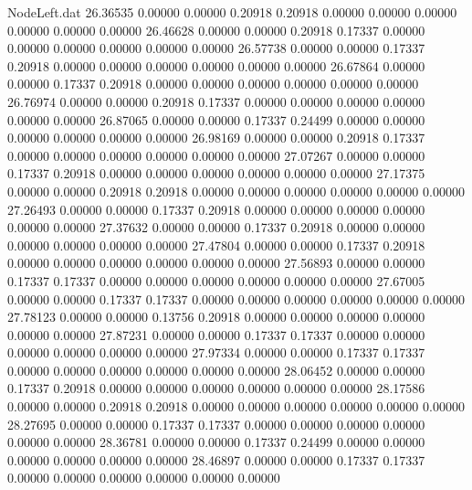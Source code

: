 \begin{filecontents}{NodeLeft.dat}
  26.36535    0.00000    0.00000     0.20918    0.20918    0.00000    0.00000    0.00000    0.00000    0.00000    0.00000
  26.46628    0.00000    0.00000     0.20918    0.17337    0.00000    0.00000    0.00000    0.00000    0.00000    0.00000
  26.57738    0.00000    0.00000     0.17337    0.20918    0.00000    0.00000    0.00000    0.00000    0.00000    0.00000
  26.67864    0.00000    0.00000     0.17337    0.20918    0.00000    0.00000    0.00000    0.00000    0.00000    0.00000
  26.76974    0.00000    0.00000     0.20918    0.17337    0.00000    0.00000    0.00000    0.00000    0.00000    0.00000
  26.87065    0.00000    0.00000     0.17337    0.24499    0.00000    0.00000    0.00000    0.00000    0.00000    0.00000
  26.98169    0.00000    0.00000     0.20918    0.17337    0.00000    0.00000    0.00000    0.00000    0.00000    0.00000
  27.07267    0.00000    0.00000     0.17337    0.20918    0.00000    0.00000    0.00000    0.00000    0.00000    0.00000
  27.17375    0.00000    0.00000     0.20918    0.20918    0.00000    0.00000    0.00000    0.00000    0.00000    0.00000
  27.26493    0.00000    0.00000     0.17337    0.20918    0.00000    0.00000    0.00000    0.00000    0.00000    0.00000
  27.37632    0.00000    0.00000     0.17337    0.20918    0.00000    0.00000    0.00000    0.00000    0.00000    0.00000
  27.47804    0.00000    0.00000     0.17337    0.20918    0.00000    0.00000    0.00000    0.00000    0.00000    0.00000
  27.56893    0.00000    0.00000     0.17337    0.17337    0.00000    0.00000    0.00000    0.00000    0.00000    0.00000
  27.67005    0.00000    0.00000     0.17337    0.17337    0.00000    0.00000    0.00000    0.00000    0.00000    0.00000
  27.78123    0.00000    0.00000     0.13756    0.20918    0.00000    0.00000    0.00000    0.00000    0.00000    0.00000
  27.87231    0.00000    0.00000     0.17337    0.17337    0.00000    0.00000    0.00000    0.00000    0.00000    0.00000
  27.97334    0.00000    0.00000     0.17337    0.17337    0.00000    0.00000    0.00000    0.00000    0.00000    0.00000
  28.06452    0.00000    0.00000     0.17337    0.20918    0.00000    0.00000    0.00000    0.00000    0.00000    0.00000
  28.17586    0.00000    0.00000     0.20918    0.20918    0.00000    0.00000    0.00000    0.00000    0.00000    0.00000
  28.27695    0.00000    0.00000     0.17337    0.17337    0.00000    0.00000    0.00000    0.00000    0.00000    0.00000
  28.36781    0.00000    0.00000     0.17337    0.24499    0.00000    0.00000    0.00000    0.00000    0.00000    0.00000
  28.46897    0.00000    0.00000     0.17337    0.17337    0.00000    0.00000    0.00000    0.00000    0.00000    0.00000

\end{filecontents}
